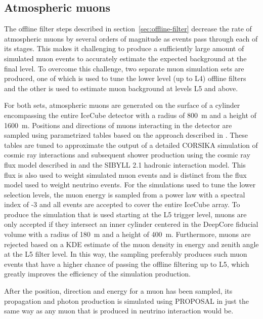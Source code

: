 \subsection{Atmospheric muons}
The offline filter steps described in section~\ref{sec:offline-filter} decrease the rate of atmospheric muons by several orders of magnitude as events pass through each of its stages.
This makes it challenging to produce a sufficiently large amount of simulated muon events to accurately estimate the expected background at the final level.
To overcome this challenge, two separate muon simulation sets are produced, one of which is used to tune the lower level (up to L4) offline filters and the other is used to estimate muon background at levels L5 and above.

For both sets, atmospheric muons are generated on the surface of a cylinder encompassing the entire IceCube detector with a radius of 800~m and a height of 1600~m.
Positions and directions of muons interacting in the detector are sampled using parametrized tables based on the approach described in .
These tables are tuned to approximate the output of a detailed \textsc{CORSIKA} simulation of cosmic ray interactions and subsequent shower production using the cosmic ray flux model described in  and the \textsc{SIBYLL 2.1} hadronic interaction model.
This flux is also used to weight simulated muon events and is distinct from the flux model used to weight neutrino events.
For the simulations used to tune the lower selection levels, the muon energy is sampled from a power law with a spectral index of -3 and all events are accepted to cover the entire IceCube array.
To produce the simulation that is used starting at the L5 trigger level, muons are only accepted if they intersect an inner cylinder centered in the DeepCore fiducial volume with a radius of 180~m and a height of 400~m.
Furthermore, muons are rejected based on a KDE estimate of the muon density in energy and zenith angle at the L5 filter level.
In this way, the sampling preferably produces such muon events that have a higher chance of passing the offline filtering up to L5, which greatly improves the efficiency of the simulation production.

After the position, direction and energy for a muon has been sampled, its propagation and photon production is simulated using \textsc{PROPOSAL} in just the same way as any muon that is produced in neutrino interaction would be.

